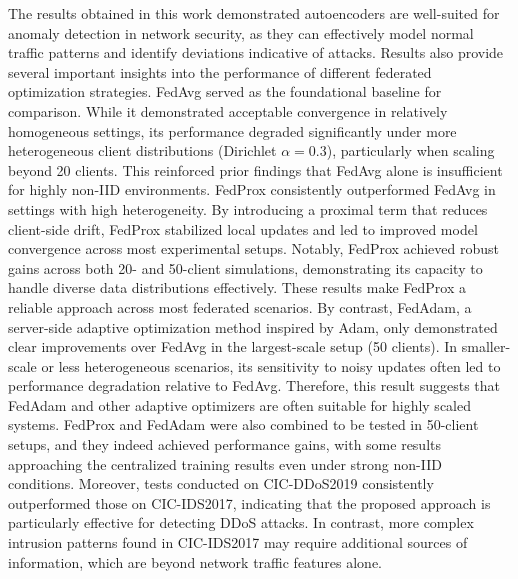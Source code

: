 The results obtained in this work demonstrated autoencoders are well-suited for anomaly detection in network security, as they can effectively model normal traffic patterns and identify deviations indicative of attacks. Results also provide several important insights into the performance of different federated optimization strategies. FedAvg served as the foundational baseline for comparison. While it demonstrated acceptable convergence in relatively homogeneous settings, its performance degraded significantly under more heterogeneous client distributions (Dirichlet $\alpha=0.3$), particularly when scaling beyond 20 clients. This reinforced prior findings that FedAvg alone is insufficient for highly non-IID environments. FedProx consistently outperformed FedAvg in settings with high heterogeneity. By introducing a proximal term that reduces client-side drift, FedProx stabilized local updates and led to improved model convergence across most experimental setups. Notably, FedProx achieved robust gains across both 20- and 50-client simulations, demonstrating its capacity to handle diverse data distributions effectively. These results make FedProx a reliable approach across most federated scenarios. By contrast, FedAdam, a server-side adaptive optimization method inspired by Adam, only demonstrated clear improvements over FedAvg in the largest-scale setup (50 clients). In smaller-scale or less heterogeneous scenarios, its sensitivity to noisy updates often led to performance degradation relative to FedAvg. Therefore, this result suggests that FedAdam and other adaptive optimizers are often suitable for highly scaled systems. FedProx and FedAdam were also combined to be tested in 50-client setups, and they indeed achieved performance gains, with some results approaching the centralized training results even under strong non-IID conditions. Moreover, tests conducted on CIC-DDoS2019 consistently outperformed those on CIC-IDS2017, indicating that the proposed approach is particularly effective for detecting DDoS attacks. In contrast, more complex intrusion patterns found in CIC-IDS2017 may require additional sources of information, which are beyond network traffic features alone.

